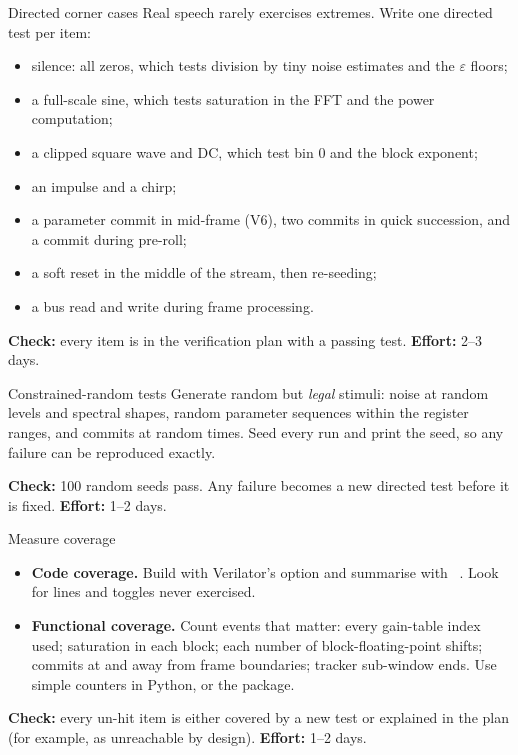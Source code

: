 \begin{stepbox}[label=st:verif:corners]{Directed corner cases}
Real speech rarely exercises extremes. Write one directed test per item:
\begin{itemize}
  \item silence: all zeros, which tests division by tiny noise estimates and
        the $\varepsilon$ floors;
  \item a full-scale sine, which tests saturation in the FFT and the power
        computation;
  \item a clipped square wave and DC, which test bin 0 and the block exponent;
  \item an impulse and a chirp;
  \item a parameter commit in mid-frame (V6), two commits in quick succession,
        and a commit during pre-roll;
  \item a soft reset in the middle of the stream, then re-seeding;
  \item a bus read and write during frame processing.
\end{itemize}

\textbf{Check:} every item is in the verification plan with a passing test.
\textbf{Effort:} 2--3 days.
\end{stepbox}

\begin{stepbox}[label=st:verif:random]{Constrained-random tests}
Generate random but \emph{legal} stimuli: noise at random levels and spectral
shapes, random parameter sequences within the register ranges, and commits at
random times. Seed every run and print the seed, so any failure can be
reproduced exactly.

\textbf{Check:} 100 random seeds pass. Any failure becomes a new directed test
before it is fixed. \textbf{Effort:} 1--2 days.
\end{stepbox}

\begin{stepbox}[label=st:verif:coverage]{Measure coverage}
\begin{itemize}
  \item \textbf{Code coverage.} Build with Verilator's  option
  and summarise with ~\cite{ch12-13:verilatorguide}.
  Look for lines and toggles never exercised.
  \item \textbf{Functional coverage.} Count events that matter: every gain-table
  index used; saturation in each block; each number of block-floating-point
  shifts; commits at and away from frame boundaries; tracker sub-window ends.
  Use simple counters in Python, or the  package.
\end{itemize}

\textbf{Check:} every un-hit item is either covered by a new test or explained
in the plan (for example, as unreachable by design). \textbf{Effort:} 1--2 days.
\end{stepbox}

